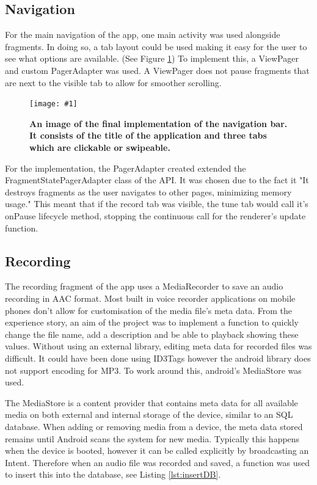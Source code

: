 \documentclass[conference]{acmsiggraph}
\newcommand{\figuremacroF}[3]{
	\begin{figure}[H] %
		\centering
		\texttt{[image: \#1]}
		\caption[#2]{\textbf{#2}}
		\label{fig:#1}
	\end{figure}
}
\begin{document}
\subsection{Navigation}

For the main navigation of the app, one main activity was used alongside fragments. In doing so, a tab layout could be used making it easy for the user to see what options are available. (See Figure \ref{fig:navBar}) To implement this, a ViewPager and custom PagerAdapter was used. A ViewPager does not pause fragments that are next to the visible tab to allow for smoother scrolling.

\figuremacroF
{navBar}
{An image of the final implementation of the navigation bar. It consists of the title of the application and three tabs which are clickable or swipeable.}
{1.0}

For the implementation, the PagerAdapter created extended the FragmentStatePagerAdapter class of the API. It was chosen due to the fact it "It destroys fragments as the user navigates to other pages, minimizing memory usage." \cite{Swipe} This meant that if the record tab was visible, the tune tab would call it's onPause lifecycle method, stopping the continuous call for the renderer's update function.

\subsection{Recording}

The recording fragment of the app uses a MediaRecorder to save an audio recording in AAC format. Most built in voice recorder applications on mobile phones don't allow for customisation of the media file's meta data. From the experience story, an aim of the project was to implement a function to quickly change the file name, add a description and be able to playback showing these values. Without using an external library, editing meta data for recorded files was difficult. It could have been done using ID3Tags however the android library does not support encoding for MP3. \cite{SupportedMedia} To work around this, android's MediaStore was used.

The MediaStore is a content provider that contains meta data for all available media on both external and internal storage of the device, similar to an SQL database. When adding or removing media from a device, the meta data stored remains until Android scans the system for new media. Typically this happens when the device is booted, however it can be called explicitly by broadcasting an Intent. \cite{MediaStore} Therefore when an audio file was recorded and saved, a function was used to insert this into the database, see Listing \ref{lst:insertDB}.
\end{document}
